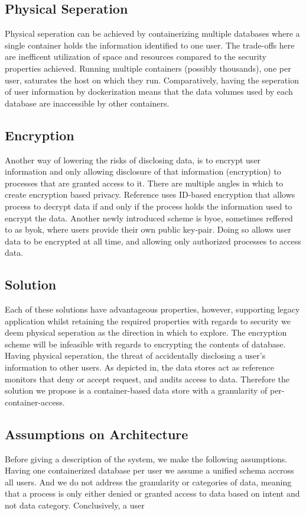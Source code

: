 \documentclass[USenglish]{uit-thesis}
\begin{document}
\subsection{Physical Seperation}
Physical seperation can be achieved by containerizing multiple databases where
a single container holds the information identified to one user.
The trade-offs here are inefficent utilization of space and resources compared to
the security properties achieved.
Running multiple containers (possibly thousands), one per user, saturates
the host on which they run.
Comparatively, having the seperation of user information by dockerization means
that the data volumes used by each database are inaccessible by other containers.

\subsection{Encryption}
Another way of lowering the risks of disclosing data, is to encrypt user information
and only allowing disclosure of that information (encryption) to processes that
are granted access to it.
There are multiple angles in which to create encryption based privacy.
Reference uses ID-based encryption that allows process to decrypt data if and only if
the process holds the information used to encrypt the data.
Another newly introduced scheme is \gls{byoe}, sometimes reffered to as \gls{byok},
where users provide their own public key-pair.
Doing so allows user data to be encrypted at all time, and allowing only authorized
processes to access data.

\subsection{Solution}
Each of these solutions have advantageous properties, however, supporting
legacy application whilst retaining the required properties with regards to security we deem
physical seperation as the direction in which to explore.
The encryption scheme will be infeasible with regards to encrypting the contents of database.
Having physical seperation, the threat of accidentally disclosing a user's information
to other users.
As depicted in, the data stores act as reference monitors that deny or accept request, and
audits access to data.
Therefore the solution we propose is a container-based data store with a granularity
of per-container-access.

\subsection{Assumptions on Architecture}
Before giving a description of the system, we make the following assumptions.
Having one containerized database per user we assume a unified schema accross
all users.
And we do not address the granularity or categories of data, meaning that
a process is only either denied or granted access to data based on intent and not data category.
Conclusively, a user 
\end{document}
